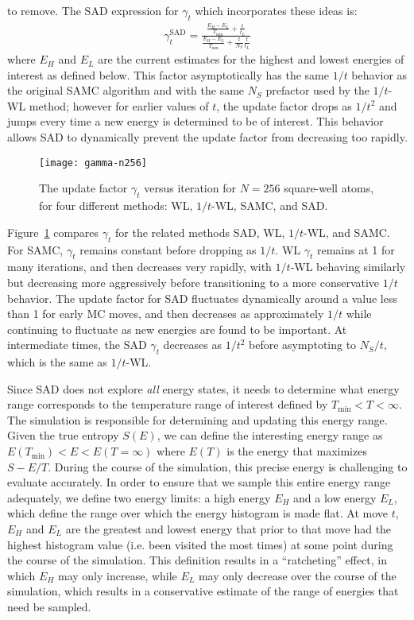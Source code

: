 \documentclass[letterpaper,twocolumn,amsmath,amssymb,pre,aps,10pt]{revtex4-1}
\begin{document}
to remove.  The SAD expression for $\gamma_t$ which incorporates these
ideas is:
\begin{align}
  \gamma_{t}^{\text{SAD}} =
     \frac{
       \frac{E_{H}-E_{L}}{T_{\text{min}}} + \frac{t}{t_L}
     }{
       \frac{E_{H}-E_{L}}{T_{\text{min}}} + \frac{t}{N_S}\frac{t}{t_L}
     }
\end{align}
where $E_H$ and $E_L$ are the current estimates for the highest and
lowest energies of interest as defined below.  This factor
asymptotically has the same $1/t$ behavior as the original SAMC
algorithm and with the same $N_S$ prefactor used by the $1/t$-WL
method; however for earlier values of $t$, the update factor drops as
$1/t^2$ and jumps every time a new energy is determined to be of
interest.  This behavior allows SAD to dynamically prevent the update
factor from decreasing too rapidly.

\begin{figure}
  \texttt{[image: gamma-n256]}
  \caption{The update factor $\gamma_t$ versus iteration for $N=256$
    square-well atoms, for four different methods: WL, $1/t$-WL, SAMC,
    and SAD.}
    \label{fig:gamma-vs-t}
\end{figure}
Figure~\ref{fig:gamma-vs-t} compares $\gamma_t$ for the related
methods SAD, WL, $1/t$-WL, and SAMC.  For SAMC, $\gamma_t$ remains
constant before dropping as $1/t$.  WL $\gamma_t$ remains at 1 for
many iterations, and then decreases very rapidly, with $1/t$-WL
behaving similarly but decreasing more aggressively before
transitioning to a more conservative $1/t$ behavior.  The update
factor for SAD fluctuates dynamically around a value less than 1 for
early MC moves, and then decreases as approximately $1/t$ while
continuing to fluctuate as new energies are found to be important.  At
intermediate times, the SAD $\gamma_t$ decreases as $1/t^2$ before
asymptoting to $N_S/t$, which is the same as $1/t$-WL.

Since SAD does not explore \emph{all} energy states, it needs to
determine what energy range corresponds to the temperature range of
interest defined by $T_{\min}<T<\infty$. The simulation is responsible
for determining and updating this energy range. Given the true entropy
$S(E)$, we can define the interesting energy range as
  $E(T_{\min}) <E< E(T=\infty)$
where $E(T)$ is the energy that maximizes $S-E/T$.  During the course of the
simulation, this precise energy is challenging to evaluate accurately.
In order to ensure that we sample this entire energy range adequately,
we define two energy limits:  a high energy $E_H$ and a low
energy $E_L$, which define the range over which the energy histogram
is made flat. At move $t$, $E_H$ and $E_L$ are the greatest and lowest
energy that prior to that move
had the highest histogram value (i.e. been visited the most times) at some point
during the course of the simulation.
This definition results in a ``ratcheting'' effect, in which $E_H$
may only increase, while $E_L$ may only decrease over the course of the
simulation, which results in a conservative estimate of the range of
energies that need be sampled.
\end{document}
